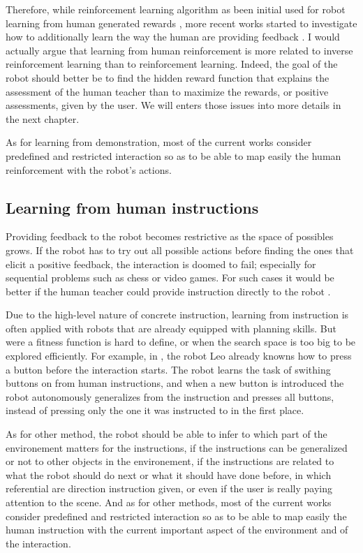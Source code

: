 Therefore, while reinforcement learning algorithm as been initial used for robot learning from human generated rewards \cite{thomaz2008teachable}, more recent works started to investigate how to additionally learn the way the human are providing feedback \cite{knox2009interactively}. I would actually argue that learning from human reinforcement is more related to inverse reinforcement learning than to reinforcement learning. Indeed, the goal of the robot should better be to find the hidden reward function that explains the assessment of the human teacher than to maximize the rewards, or positive assessments, given by the user. We will enters those issues into more details in the next chapter.

As for learning from demonstration, most of the current works consider predefined and restricted interaction so as to be able to map easily the human reinforcement with the robot's actions.

\subsection{Learning from human instructions}

Providing feedback to the robot becomes restrictive as the space of possibles grows. If the robot has to try out all possible actions before finding the ones that elicit a positive feedback, the interaction is doomed to fail; especially for sequential problems such as chess or video games. For such cases it would be better if the human teacher could provide instruction directly to the robot \cite{breazeal2004tutelage}.

Due to the high-level nature of concrete instruction, learning from instruction is often applied with robots that are already equipped with planning skills. But were a fitness function is hard to define, or when the search space is too big to be explored efficiently. For example, in \cite{lockerd2004tutelage}, the robot Leo already knowns how to press a button before the interaction starts. The robot learns the task of swithing buttons on from human instructions, and when a new button is introduced the robot autonomously generalizes from the instruction and presses all buttons, instead of pressing only the one it was instructed to in the first place. 

As for other method, the robot should be able to infer to which part of the environement matters for the instructions, if the instructions can be generalized or not to other objects in the environement, if the instructions are related to what the robot should do next or what it should have done before, in which referential are direction instruction given, or even if the user is really paying attention to the scene. And as for other methods, most of the current works consider predefined and restricted interaction so as to be able to map easily the human instruction with the current important aspect of the environment and of the interaction.

